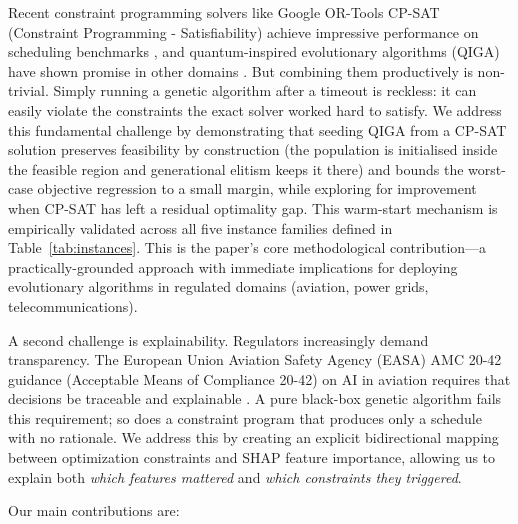 \documentclass[12pt,number]{elsarticle}
\begin{document}
Recent constraint programming solvers like Google OR-Tools CP-SAT (Constraint Programming - Satisfiability) achieve impressive performance on scheduling benchmarks \cite{perron2023,laborie2018}, and quantum-inspired evolutionary algorithms (QIGA) have shown promise in other domains \cite{zhang2011}. But combining them productively is non-trivial. Simply running a genetic algorithm after a timeout is reckless: it can easily violate the constraints the exact solver worked hard to satisfy. We address this fundamental challenge by demonstrating that seeding QIGA from a CP-SAT solution preserves feasibility by construction (the population is initialised inside the feasible region and generational elitism keeps it there) and bounds the worst-case objective regression to a small margin, while exploring for improvement when CP-SAT has left a residual optimality gap. This warm-start mechanism is empirically validated across all five instance families defined in Table~\ref{tab:instances}. This is the paper's core methodological contribution---a practically-grounded approach with immediate implications for deploying evolutionary algorithms in regulated domains (aviation, power grids, telecommunications).

A second challenge is explainability. Regulators increasingly demand transparency. The European Union Aviation Safety Agency (EASA) AMC 20-42 guidance (Acceptable Means of Compliance 20-42) on AI in aviation requires that decisions be traceable and explainable \cite{easa2023}. A pure black-box genetic algorithm fails this requirement; so does a constraint program that produces only a schedule with no rationale. We address this by creating an explicit bidirectional mapping between optimization constraints and SHAP feature importance, allowing us to explain both \emph{which features mattered} and \emph{which constraints they triggered}.

Our main contributions are:
\end{document}
